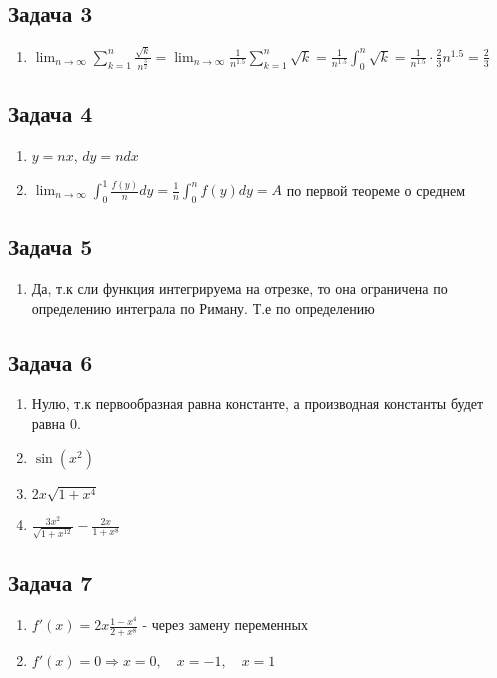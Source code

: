 \documentclass[a4paper,12pt]{article}
\begin{document}
\subsection{Задача 3}
\begin{enumerate}
    \item $\lim_{n \to \infty} \sum_{k=1}^{n}\frac{\sqrt{k}}{n^\frac{3}{2}} = \lim_{n \to \infty} \frac{1}{n^{1.5}}\sum_{k=1}^{n}\sqrt{k} = \frac{1}{n^{1.5}}\int_{0}^{n}\sqrt{k}=\frac{1}{n^{1.5}}\cdot \frac{2}{3}n^{1.5}=\frac{2}{3}$ 
\end{enumerate}

\subsection{Задача 4}
\begin{enumerate}
    \item $y = nx$, $dy = ndx$
    \item $\lim_{n \to \infty} \int_{0}^{1} \frac{f(y)}{n}dy = \frac{1}{n}\int_{0}^{n} {f(y)dy} = A$ по первой теореме о среднем
\end{enumerate}


\subsection{Задача 5}
\begin{enumerate}
    \item  Да, т.к сли функция интегрируема на отрезке, то она ограничена по определению интеграла по Риману.  Т.е по определению
\end{enumerate}

\subsection{Задача 6}

\begin{enumerate}
    \item Нулю, т.к первообразная равна константе, а производная константы будет равна 0.
    \item $\sin(x^2)$
    \item $2x\sqrt{1+x^4}$
    \item $\frac{3x^2}{\sqrt{1+x^{12}}}-\frac{2x}{1+x^8}$
\end{enumerate}

\subsection{Задача 7}
\begin{enumerate}
    \item $f'(x) = 2x\frac{1-x^4}{2+x^8}$ - через замену переменных
    \item $f'(x)= 0 \Rightarrow x=0, \quad x=-1, \quad x=1$
\end{enumerate}
\end{document}
